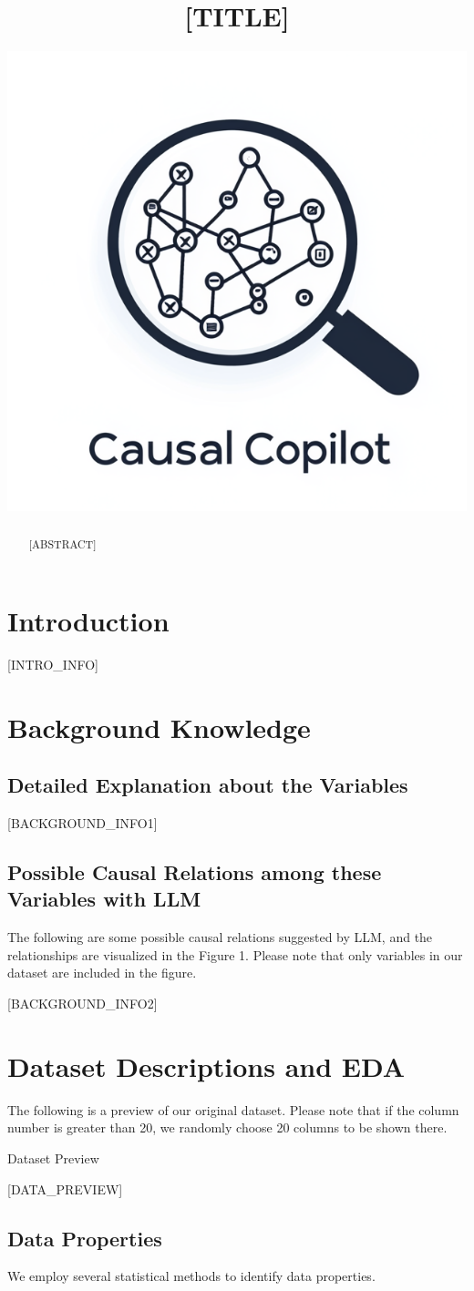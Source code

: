 \documentclass{article}
\title{[TITLE]}
\author{ \href{https://orcid.org/0000-0000-0000-0000}{\includegraphics[scale=0.06]{asset/logo.png}} }
\begin{document}
\maketitle

\begin{abstract}
[ABSTRACT]
\end{abstract}


\raggedbottom
\section{Introduction}
[INTRO_INFO]

\section{Background Knowledge}
\subsection{Detailed Explanation about the Variables}
[BACKGROUND_INFO1]

\subsection{Possible Causal Relations among these Variables with LLM}

The following are some possible causal relations suggested by LLM, and the relationships are visualized
in the Figure 1. Please note that only variables in our dataset are included in the figure.

[BACKGROUND_INFO2]

\section{Dataset Descriptions and EDA}
The following is a preview of our original dataset. Please note that if the column number is greater than 20,
we randomly choose 20 columns to be shown there.

\begin{table}[H]
    \centering
    \caption{Dataset Preview}
    [DATA_PREVIEW]
\end{table}

\subsection{Data Properties}
We employ several statistical methods to identify data properties.
\end{document}
